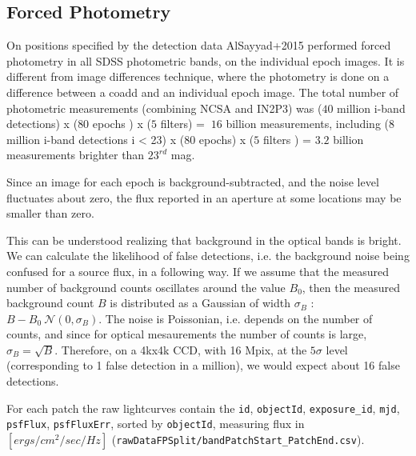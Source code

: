 \documentclass[fleqn,usenatbib]{mnras}  %
\begin{document}
\subsection{Forced Photometry}
On positions specified by the detection data AlSayyad+2015 performed forced photometry in all SDSS photometric bands, on the individual epoch images. It is different from image differences technique, where the photometry is done on a difference between a coadd and an individual epoch image.  The total number of photometric measurements (combining NCSA and IN2P3) was  ($40$  million i-band detections) x ($80$ epochs ) x ($5$ filters) = $~16$ billion measurements, including   ($8$ million i-band detections i < 23) x ($80$ epochs) x ($5$ filters ) = $3.2$ billion measurements brighter than $23^{rd}$ mag.

Since an image for each epoch is background-subtracted, and the noise level fluctuates about zero,  the flux reported in an aperture at some locations may be smaller than zero. 

This can be understood realizing that background in the  optical bands is bright. We can calculate the likelihood of false detections, i.e. the background noise being confused for a source flux, in a following way. If we assume that the measured number of background counts oscillates around the value $B_{0}$, then the measured background count $B$  is distributed as  a Gaussian of width $\sigma_{B}$ :   $B-B_{0}  ~  \mathcal{N}(0,\sigma_{B})$. The noise is Poissonian, i.e. depends on  the number of counts, and since for optical mesaurements the number of counts is large,  $\sigma_{B} = \sqrt {B}$. Therefore, on a 4kx4k  CCD, with 16 Mpix, at the $5\sigma$ level (corresponding  to  1 false detection in a million), we would expect about 16 false detections.  

For each patch the raw lightcurves contain the \verb|id|, \verb|objectId|, \verb|exposure_id|, \verb|mjd|, \verb|psfFlux|, \verb|psfFluxErr|, sorted by \verb|objectId|, measuring flux in $[ergs/ cm^{2} / sec / Hz]$ (\verb|rawDataFPSplit/bandPatchStart_PatchEnd.csv|). 
\end{document}
